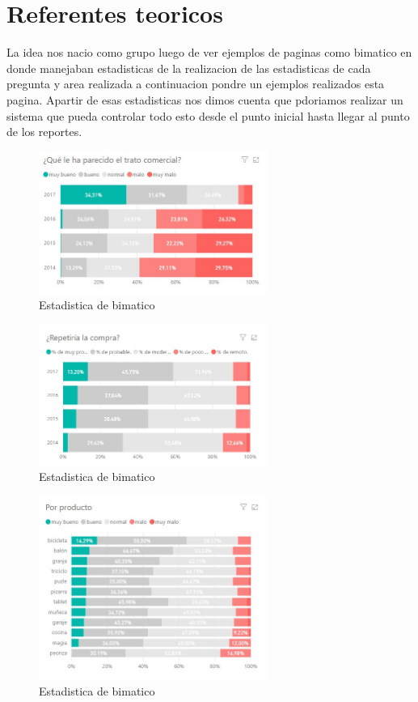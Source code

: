 \documentclass[twoside,twocolumn]{article}
\begin{document}
\section{Referentes teoricos}
La idea nos nacio como grupo luego de ver ejemplos de paginas como bimatico en donde manejaban estadisticas de la realizacion de las estadisticas de cada pregunta y area realizada
a continuacion pondre un ejemplos realizados esta pagina. Apartir de esas estadisticas nos dimos cuenta que pdoriamos realizar un sistema que pueda controlar todo esto desde el punto inicial hasta llegar al punto de los reportes.
\begin{figure}[h!]
	\begin{center}
		\includegraphics[width=7.5cm]{./Imagenes/esta1} 
		\caption{Estadistica de bimatico}
	\end{center}
\end{figure}
\begin{figure}[h!]
	\begin{center}
		\includegraphics[width=7.5cm]{./Imagenes/esta2} 
		\caption{Estadistica de bimatico}
	\end{center}
\end{figure}
\begin{figure}[h!]
	\begin{center}
		\includegraphics[width=7.5cm]{./Imagenes/esta3} 
		\caption{Estadistica de bimatico}
	\end{center}
\end{figure}
\end{document}
